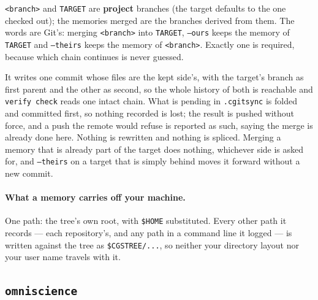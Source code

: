 \texttt{<branch>} and \texttt{TARGET} are \textbf{project} branches (the
target defaults to the one checked out); the memories merged are the branches
derived from them. The words are Git's: merging \texttt{<branch>} into
\texttt{TARGET}, \texttt{--ours} keeps the memory of \texttt{TARGET} and
\texttt{--theirs} keeps the memory of \texttt{<branch>}. Exactly one is
required, because which chain continues is never guessed.

It writes one commit whose files are the kept side's, with the target's branch
as first parent and the other as second, so the whole history of both is
reachable and \texttt{verify check} reads one intact chain. What is pending
in \texttt{.cgitsync} is folded and committed first, so nothing recorded is
lost; the result is pushed without force, and a push the remote would refuse
is reported as such, saying the merge is already done here. Nothing is
rewritten and nothing is spliced. Merging a memory that is already part of the
target does nothing, whichever side is asked for, and \texttt{--theirs} on a
target that is simply behind moves it forward without a new commit.

\paragraph{What a memory carries off your machine.} One path: the tree's own
root, with \texttt{\$HOME} substituted. Every other path it records --- each
repository's, and any path in a command line it logged --- is written
against the tree as \texttt{\$CGSTREE/...}, so neither your directory
layout nor your user name travels with it.

\subsection{\texttt{omniscience}}

